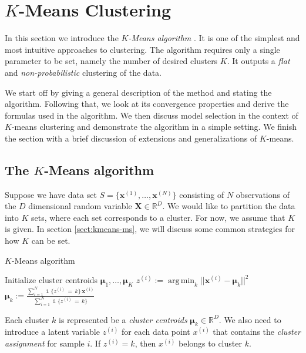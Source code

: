 \documentclass[final,3p,times,twocolumn]{elsarticle}
\DeclareMathOperator*{\argmin}{arg\,min}
\let\bs\boldsymbol
\DeclareMathOperator*{\id}{\mathds{1}}
\begin{document}
\section{$K$-Means Clustering}
In this section we introduce the \emph{$K$-Means algorithm} \cite{lloyd1982}.
It is one of the simplest and most intuitive approaches to clustering.
The algorithm requires only a single parameter to be set, namely the number of desired clusters $K$. 
It outputs a \emph{flat} and \emph{non-probabilistic} clustering of the data.

We start off by giving a general description of the method and stating the algorithm.
Following that, we look at its convergence properties and derive the formulas used in the algorithm.
We then discuss model selection in the context of $K$-means clustering and demonstrate the algorithm in a simple setting.
We finish the section with a brief discussion of extensions and generalizations of $K$-means.



\subsection{The $K$-Means algorithm}
Suppose we have data set $S = \{\bs x^{(1)},\dots,\bs x^{(N)}\}$ consisting of $N$ observations of the $D$ dimensional random variable $\bs X \in \mathbb{R}^D$.
We would like to partition the data into $K$ sets, where each set corresponds to a cluster.
For now, we assume that $K$ is given. In section \ref{sect:kmeans-ms}, we will discuss some common strategies for how $K$ can be set.

\begin{algorithm}
\caption{$K$-Means algorithm}
\label{alg:kmeans}
\begin{algorithmic}[1]
\State Initialize cluster centroids $\bs\mu_1,\dots,\bs\mu_K$
\Statex
\Repeat
{}
\State $z^{(i)} := \argmin_k ||\bs x^{(i)} - \bs\mu_k||^2$
\EndFor
\Statex
{}
\State $\bs\mu_k := \frac{\sum_{i=1}^N \id \{z^{(i)}\,=\,k\}\, \bs x^{(i)}}{\sum_{i=1}^N \id\{z^{(i)}\,=\,k\}}$
\EndFor
{}
\Statex\State\Return{$z^{(1)}, \dots, z^{(N)}, \bs\mu_1, \dots, \bs\mu_K$}
\end{algorithmic}
\end{algorithm}

Each cluster $k$ is represented be a \emph{cluster centroids} $\bs\mu_k \in \mathbb{R}^D$.
We also need to introduce a latent variable $z^{(i)}$ for each data point $x^{(i)}$ that contains the \emph{cluster assignment} for sample $i$.
If $z^{(i)} = k$, then $x^{(i)}$ belongs to cluster $k$.
\end{document}
